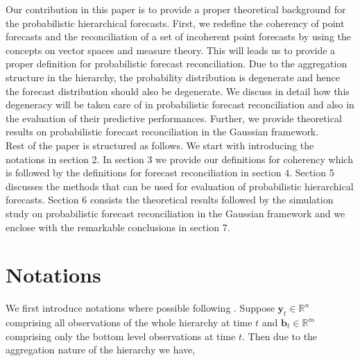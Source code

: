 \documentclass[a4paper, 11pt]{article}
\begin{document}
\noindent
Our contribution in this paper is to provide a proper theoretical background for the probabilistic hierarchical forecasts. First, we redefine the coherency of point forecasts and the reconciliation of a set of incoherent point forecasts by using the concepts on vector spaces and measure theory. This will leads us to provide a proper definition for probabilistic forecast reconciliation. Due to the aggregation structure in the hierarchy, the probability distribution is degenerate and hence the forecast distribution should also be degenerate. We discuss in detail how this degeneracy will be taken care of in probabilistic forecast reconciliation and also in the evaluation of their predictive performances. Further, we provide theoretical results on probabilistic forecast reconciliation in the Gaussian framework. \\

\noindent
Rest of the paper is structured as follows. We start with introducing the notations in section 2. In section 3 we provide our definitions for coherency which is followed by the definitions for forecast reconciliation in section 4. Section 5 discusses the methods that can be used for evaluation of probabilistic hierarchical forecasts. Section 6 consists the theoretical results followed by the simulation study on probabilistic forecast reconciliation in the Gaussian framework and we enclose with the remarkable conclusions in section 7.     



\section{Notations}
We first introduce notations where possible following \citet{Wickramasuriya2017}. Suppose $\mathbold{y}_t \in \bm{\mathbb{R}}^n$ comprising all observations of the whole hierarchy at time $t$ and $\mathbold{b}_t \in \bm{\mathbb{R}}^m$ comprising only the bottom level observations at  time $t$. Then due to the aggregation nature of the hierarchy we have, 
\end{document}
